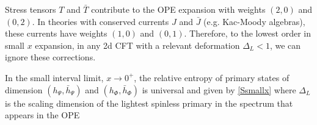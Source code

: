 \documentclass[11pt]{article}
\newcommand{\NL}[1]{\textcolor{blue}{#1}}
\begin{document}
Stress tensors $T$ and $\bar{T}$ contribute to the OPE expansion with weights $(2,0)$ and $(0,2)$. In theories with conserved currents $J$ and $\bar{J}$ (e.g. Kac-Moody algebras), these currents have weights $(1,0)$ and $(0,1)$. Therefore, to the lowest order in small $x$ expansion, in any 2d CFT with a relevant deformation $\Delta_L<1$, we can ignore these corrections. 


  In the small interval limit, $x\to 0^+$, the relative entropy of primary states of dimension 
  $(h_\Psi,\bar{h}_\Psi)$ and $(h_\Phi,\bar{h}_\Phi)$
  is universal and given by \ref{Ssmallx}
  where $\Delta_L$ is the scaling dimension of the lightest spinless primary in the spectrum that appears in the OPE
\end{document}
